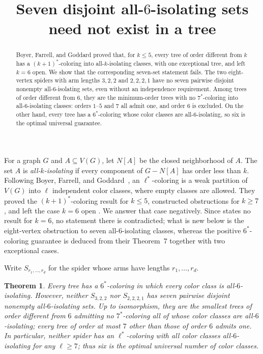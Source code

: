 \documentclass[11pt]{amsart}
\title{Seven disjoint all-\texorpdfstring{$6$}{6}-isolating sets need not exist in a tree}
\date{}
\newtheorem{theorem}{Theorem}
\begin{document}
\begin{abstract}
Boyer, Farrell, and Goddard proved that, for $k\leq 5$, every tree of order
different from $k$ has a $(k+1)^{*}$-coloring into all-$k$-isolating classes,
with one exceptional tree, and left $k=6$ open.  We show that the corresponding
seven-set statement fails.  The two eight-vertex spiders with arm lengths
$3,2,2$ and $2,2,2,1$ have no seven pairwise disjoint nonempty
all-$6$-isolating sets, even without an independence requirement.  Among
trees of order different from $6$, they are the minimum-order trees with no
$7^{*}$-coloring into all-$6$-isolating classes: orders $1$--$5$ and $7$ all
admit one, and order $6$ is excluded.  On the other hand,
every tree has a $6^{*}$-coloring whose color classes are all-$6$-isolating,
so six is the optimal universal guarantee.
\end{abstract}

\maketitle

For a graph $G$ and $A\subseteq V(G)$, let $N[A]$ be the closed neighborhood
of $A$.  The set $A$ is \emph{all-$k$-isolating} if every component of
$G-N[A]$ has order less than $k$.  Following Boyer, Farrell, and
Goddard~\cite{BFG}, an $\ell^{*}$-coloring is a weak partition of $V(G)$ into
$\ell$ independent color classes, where empty classes are allowed.  They
proved the $(k+1)^{*}$-coloring result for $k\leq 5$, constructed obstructions
for $k\geq 7$, and left the case $k=6$ open \cite[Theorem~7 and the paragraph following Lemma~8]{BFG}.  We
answer that case negatively.  Since \cite{BFG} states no result for $k=6$, no
statement there is contradicted; what is new below is the eight-vertex
obstruction to seven all-$6$-isolating classes, whereas the positive
$6^{*}$-coloring guarantee is deduced from their Theorem~7 together with two
exceptional cases.

Write $S_{r_1,\ldots,r_d}$ for the spider whose arms have lengths
$r_1,\ldots,r_d$.

\begin{theorem}
Every tree has a $6^{*}$-coloring in which every color class is
all-$6$-isolating.  However, neither $S_{3,2,2}$ nor $S_{2,2,2,1}$ has seven
pairwise disjoint nonempty all-$6$-isolating sets.  Up to isomorphism, they
are the smallest trees of order different from $6$ admitting no
$7^{*}$-coloring all of whose color classes are all-$6$-isolating; every tree
of order at most $7$ other than those of order $6$ admits one.
In particular, neither spider has an $\ell^{*}$-coloring
with all color classes all-$6$-isolating for any $\ell\geq 7$; thus six is
the optimal universal number of color classes.
\end{theorem}
\end{document}
